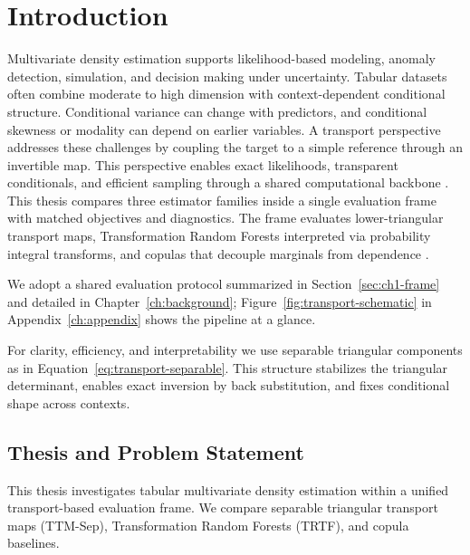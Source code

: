 \documentclass[11pt,a4paper,twoside]{book}\usepackage[]{graphicx}\usepackage[]{xcolor}
\begin{document}
\chapter{Introduction}\label{ch:intro}

Multivariate density estimation supports likelihood-based modeling, anomaly detection, simulation, and decision making under uncertainty. Tabular datasets often combine moderate to high dimension with context-dependent conditional structure. Conditional variance can change with predictors, and conditional skewness or modality can depend on earlier variables. A transport perspective addresses these challenges by coupling the target to a simple reference through an invertible map. This perspective enables exact likelihoods, transparent conditionals, and efficient sampling through a shared computational backbone \citep{rosenblatt1952remarks,knothe1957contributions}. This thesis compares three estimator families inside a single evaluation frame with matched objectives and diagnostics. The frame evaluates lower-triangular transport maps, Transformation Random Forests interpreted via probability integral transforms, and copulas that decouple marginals from dependence \citep{hothorn2017transformation,hothorn2018conditional,sklar1959fonctions}.
\medskip

We adopt a shared evaluation protocol summarized in Section~\ref{sec:ch1-frame} and detailed in Chapter~\ref{ch:background}; Figure~\ref{fig:transport-schematic} in Appendix~\ref{ch:appendix} shows the pipeline at a glance.
\medskip

For clarity, efficiency, and interpretability we use separable triangular components as in Equation~\eqref{eq:transport-separable}. This structure stabilizes the triangular determinant, enables exact inversion by back substitution, and fixes conditional shape across contexts.

\section{Thesis and Problem Statement}\label{sec:ch1-problem}
This thesis investigates tabular multivariate density estimation within a unified transport-based evaluation frame. We compare separable triangular transport maps (TTM-Sep), Transformation Random Forests (TRTF), and copula baselines.
\medskip
\end{document}
